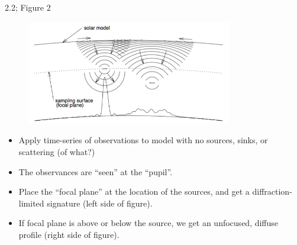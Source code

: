 \documentclass{beamer}
\begin{document}
\begin{frame}{2.2; Figure 2}
    \begin{figure}
        \includegraphics[width=0.8\textwidth]{fig_2.png}
    \end{figure}
    \begin{itemize}
        \item Apply time-series of observations to model with no
            sources, sinks, or scattering (of what?)
        \item The observances are ``seen'' at the ``pupil''.
        \item Place the ``focal plane'' at the location of the
            sources, and get a diffraction-limited signature
            (left side of figure).
        \item If focal plane is above or below the source, we get an
            unfocused, diffuse profile (right side of figure).
    \end{itemize}
\end{frame}
\end{document}
